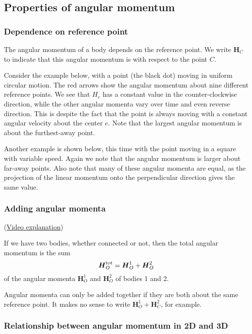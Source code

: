 \documentclass{article}
\renewcommand{\vec}[1]{\boldsymbol{#1}}
\begin{document}
\subsection{Properties of angular momentum}

\subsubsection{Dependence on reference point}

The angular momentum of a body depends on the reference
point. We write $\vec{H}_C$ to indicate that this angular momentum is
with respect to the point $C$.

Consider the example below, with a point (the black dot) moving in
uniform circular motion. The red arrows show the angular momentum
about nine different reference points. We see that $H_e$ has a
constant value in the counter-clockwise direction, while the other
angular momenta vary over time and even reverse direction. This is
despite the fact that the point is always moving with a constant
angular velocity about the center $e$. Note that the largest angular
momentum is about the furthest-away point.

Another example is shown below, this time with the point moving in a
square with variable speed. Again we note that the angular momentum is
larger about far-away points. Also note that many of these angular
momenta are equal, as the projection of the linear momentum onto the
perpendicular direction gives the same value.

\subsubsection{Adding angular momenta}

(\href{angular_momentum_adding_video}{Video explanation}) 

If we have two bodies, whether connected or not, then the total
angular momentum is the sum
\begin{equation}
  \label{eqn:ang_mom_addition}
  \vec{H}_O^{\rm tot} = \vec{H}_O^1 + \vec{H}_O^2
\end{equation}
of the angular momenta $\vec{H}_O^1$ and $\vec{H}_O^2$ of bodies 1 and
2.

\danger Angular momenta can only be added together if they are both
about the same reference point. It makes no sense to write
$\vec{H}_O^1 + \vec{H}_C^2$, for example.

\subsubsection{Relationship between angular momentum in 2D and 3D}
\end{document}
